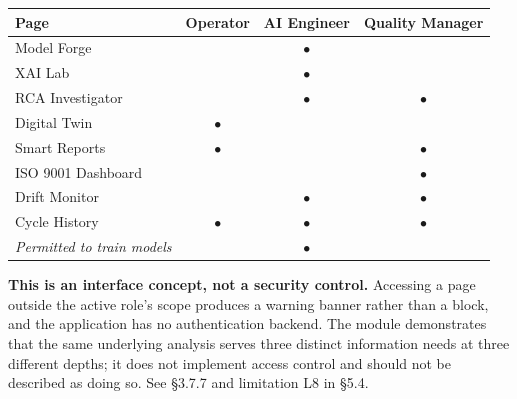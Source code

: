 \begin{longtable}[]{@{}lccc@{}}
\toprule\noalign{}
Page & Operator & AI Engineer & Quality Manager \\
\midrule\noalign{}
\endhead
\bottomrule\noalign{}
\endlastfoot
Model Forge & & $\bullet$ & \\
XAI Lab & & $\bullet$ & \\
RCA Investigator & & $\bullet$ & $\bullet$ \\
Digital Twin & $\bullet$ & & \\
Smart Reports & $\bullet$ & & $\bullet$ \\
ISO 9001 Dashboard & & & $\bullet$ \\
Drift Monitor & & $\bullet$ & $\bullet$ \\
Cycle History & $\bullet$ & $\bullet$ & $\bullet$ \\
\emph{Permitted to train models} & & $\bullet$ & \\
\end{longtable}

\textbf{This is an interface concept, not a security control.} Accessing a page outside the active role's scope produces a warning banner rather than a block, and the application has no authentication backend. The module demonstrates that the same underlying analysis serves three distinct information needs at three different depths; it does not implement access control and should not be described as doing so. See §3.7.7 and limitation L8 in §5.4.
